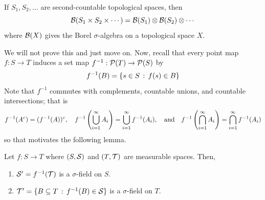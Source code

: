 \begin{lemma}
    If $S_1, S_2, \ldots$ are second-countable topological spaces, then
    \[ \cal{B}(S_1 \times S_2 \times \cdots) = \cal{B}(S_1) \otimes \cal{B}(S_2) \otimes \cdots \]
    where $\cal{B}(X)$ gives the Borel $\sigma$-algebra on a topological space $X$. 
\end{lemma}
We will not prove this and just move on. Now, recall that every point map $f : S \to T$ induces a set map $f^{-1} : \P(T) \to \P(S)$ by
\[ f^{-1}(B) = \{s \in S \col f(s) \in B\} \]
Note that $f^{-1}$ commutes with complements, countable unions, and countable intersections; that is
\[ f^{-1}(A^{c}) = (f^{-1}(A))^{c}, \quad f^{-1}\left(\bigcup_{i = 1}^{\infty} A_{i}\right) = \bigcup_{i = 1}^{\infty} f^{-1}(A_i), \quand f^{-1}\left(\bigcap_{i = 1}^{\infty} A_i\right) = \bigcap_{i = 1}^{\infty} f^{-1}(A_i) \]
so that motivates the following lemma.

\begin{lemma}
    Let $f : S \to T$ where $(S, \cal{S})$ and $(T, \cal{T})$ are measurable spaces. Then,
    \begin{enumerate}
        \item $\cal{S}' = f^{-1}(\cal{T})$ is a $\sigma$-field on $S$.
        \item $\cal{T}' = \{B \subseteq T \col f^{-1}(B) \in \cal{S}\}$ is a $\sigma$-field on $T$. 
    \end{enumerate}
\end{lemma}

